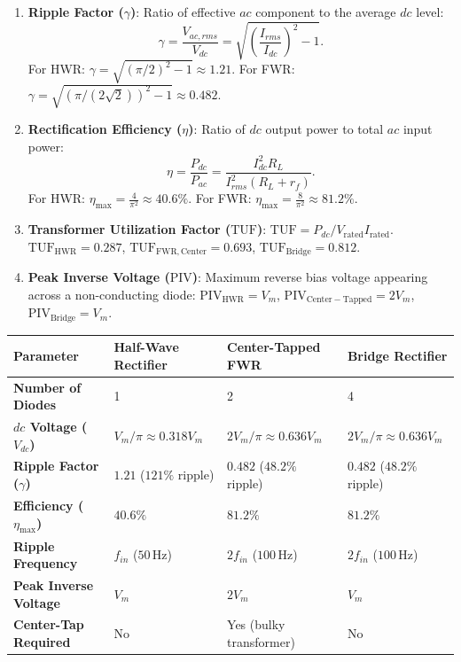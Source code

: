 \documentclass[12pt,a4paper]{article}
\begin{document}
\begin{tcolorbox}[formulabox, title={Performance Metrics of Rectifiers}]
\begin{enumerate}[leftmargin=1.5em, itemsep=2pt]
  \item \textbf{Ripple Factor ($\gamma$)}: Ratio of effective $ac$ component to the average $dc$ level:
  \[
  \gamma = \frac{V_{ac,rms}}{V_{dc}} = \sqrt{\left(\frac{I_{rms}}{I_{dc}}\right)^2 - 1}.
  \]
  For HWR: $\gamma = \sqrt{(\pi/2)^2 - 1} \approx 1.21$. For FWR: $\gamma = \sqrt{(\pi/(2\sqrt{2}))^2 - 1} \approx 0.482$.
  \item \textbf{Rectification Efficiency ($\eta$)}: Ratio of $dc$ output power to total $ac$ input power:
  \[
  \eta = \frac{P_{dc}}{P_{ac}} = \frac{I_{dc}^2 R_L}{I_{rms}^2 (R_L + r_f)}.
  \]
  For HWR: $\eta_{\max} = \frac{4}{\pi^2} \approx 40.6\%$. For FWR: $\eta_{\max} = \frac{8}{\pi^2} \approx 81.2\%$.
  \item \textbf{Transformer Utilization Factor ($\mathrm{TUF}$)}: $\mathrm{TUF} = P_{dc} / V_{\text{rated}}I_{\text{rated}}$.
  $\mathrm{TUF}_{\mathrm{HWR}} = 0.287$, $\mathrm{TUF}_{\mathrm{FWR,Center}} = 0.693$, $\mathrm{TUF}_{\mathrm{Bridge}} = 0.812$.
  \item \textbf{Peak Inverse Voltage ($\mathrm{PIV}$)}: Maximum reverse bias voltage appearing across a non-conducting diode:
  $\mathrm{PIV}_{\mathrm{HWR}} = V_m$, $\mathrm{PIV}_{\mathrm{Center-Tapped}} = 2V_m$, $\mathrm{PIV}_{\mathrm{Bridge}} = V_m$.
\end{enumerate}
\end{tcolorbox}

\par\vspace{6pt}\noindent
\begin{tabularx}{\linewidth}{|B{3.4cm}|Y|Y|Y|}
\hline
\textbf{Parameter} & \textbf{Half-Wave Rectifier} & \textbf{Center-Tapped FWR} & \textbf{Bridge Rectifier} \\
\hline
\textbf{Number of Diodes} & 1 & 2 & 4 \\
\hline
\textbf{$dc$ Voltage ($V_{dc}$)} & $V_m/\pi \approx 0.318 V_m$ & $2V_m/\pi \approx 0.636 V_m$ & $2V_m/\pi \approx 0.636 V_m$ \\
\hline
\textbf{Ripple Factor ($\gamma$)} & $1.21$ ($121\%$ ripple) & $0.482$ ($48.2\%$ ripple) & $0.482$ ($48.2\%$ ripple) \\
\hline
\textbf{Efficiency ($\eta_{\max}$)}& $40.6\%$ & $81.2\%$ & $81.2\%$ \\
\hline
\textbf{Ripple Frequency} & $f_{in}$ ($50\,\mathrm{Hz}$) & $2f_{in}$ ($100\,\mathrm{Hz}$) & $2f_{in}$ ($100\,\mathrm{Hz}$) \\
\hline
\textbf{Peak Inverse Voltage} & $V_m$ & $2V_m$ & $V_m$ \\
\hline
\textbf{Center-Tap Required}& No & Yes (bulky transformer) & No \\
\hline
\end{tabularx}
\par\vspace{12pt}
\end{document}
